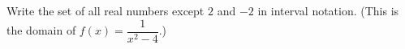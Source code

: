 Write the set of all real numbers except $2$ and $-2$ in interval notation. (This is the domain of $f(x)=\dfrac{1}{x^2-4}$.)
